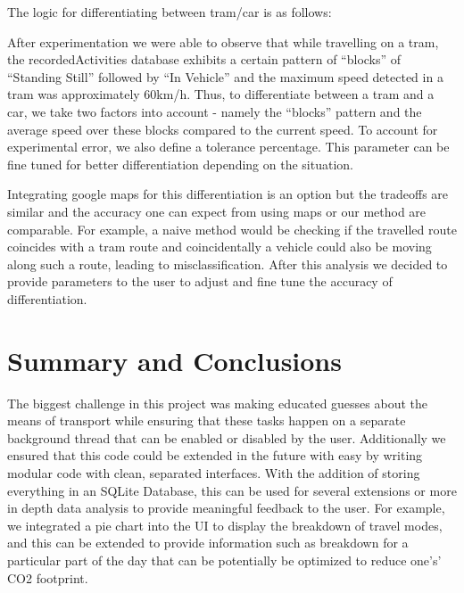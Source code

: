 \documentclass[10pt,conference,compsocconf]{IEEEtran}
\begin{document}
The logic for differentiating between tram/car is as follows:

After experimentation we were able to observe that while travelling on a tram, the recordedActivities database exhibits a certain pattern of “blocks” of “Standing Still” followed by “In Vehicle” and the maximum speed detected in a tram was approximately 60km/h. Thus, to differentiate between a tram and a car, we take two factors into account - namely the “blocks” pattern and the average speed over these blocks compared to the current speed. To account for experimental error, we also define a tolerance percentage. This parameter can be fine tuned for better differentiation depending on the situation.

Integrating google maps for this differentiation is an option but the tradeoffs are similar and the accuracy one can expect from using maps or our method are comparable. For example, a naive method would be checking if the travelled route coincides with a tram route and coincidentally a vehicle could also be moving along such a route, leading to misclassification. After this analysis we decided to provide parameters to the user to adjust and fine tune the accuracy of differentiation.

\section{Summary and Conclusions}

The biggest challenge in this project was making educated guesses about the means of transport while ensuring that these tasks happen on a separate background thread that can be enabled or disabled by the user. Additionally we ensured that this code could be extended in the future with easy by writing modular code with clean, separated interfaces. With the addition of storing everything in an SQLite Database, this can be used for several extensions or more in depth data analysis to provide meaningful feedback to the user. For example, we integrated a pie chart into the UI to display the breakdown of travel modes, and this can be extended to provide information such as breakdown for a particular part of the day that can be potentially be optimized to reduce one's’ CO2 footprint.





\clearpage
\end{document}
